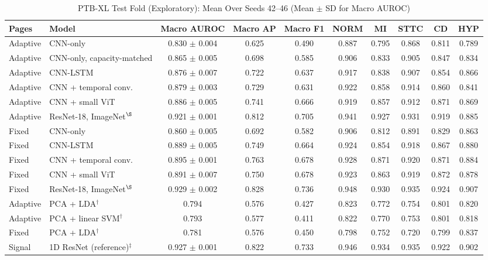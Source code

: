 \documentclass[journal]{IEEEtran}
\begin{document}
\begin{table}[!t]
\centering
\caption{PTB-XL Test Fold (Exploratory): Mean Over Seeds 42--46 (Mean $\pm$ SD for Macro AUROC)}
\label{tab:ptbxl}
\footnotesize
\begin{tabular}{llcccccccc}
\toprule
Pages & Model & Macro AUROC & Macro AP & Macro F1 & NORM & MI & STTC & CD & HYP \\
\midrule
Adaptive & CNN-only & 0.830 $\pm$ 0.004 & 0.625 & 0.490 & 0.887 & 0.795 & 0.868 & 0.811 & 0.789 \\
Adaptive & CNN-only, capacity-matched & 0.865 $\pm$ 0.005 & 0.698 & 0.585 & 0.906 & 0.833 & 0.905 & 0.847 & 0.834 \\
Adaptive & CNN-LSTM & 0.876 $\pm$ 0.007 & 0.722 & 0.637 & 0.917 & 0.838 & 0.907 & 0.854 & 0.866 \\
Adaptive & CNN + temporal conv. & 0.879 $\pm$ 0.003 & 0.729 & 0.631 & 0.922 & 0.858 & 0.914 & 0.860 & 0.841 \\
Adaptive & CNN + small ViT & 0.886 $\pm$ 0.005 & 0.741 & 0.666 & 0.919 & 0.857 & 0.912 & 0.871 & 0.869 \\
Adaptive & ResNet-18, ImageNet$^\S$ & 0.921 $\pm$ 0.001 & 0.812 & 0.705 & 0.941 & 0.927 & 0.931 & 0.919 & 0.885 \\
\midrule
Fixed & CNN-only & 0.860 $\pm$ 0.005 & 0.692 & 0.582 & 0.906 & 0.812 & 0.891 & 0.829 & 0.863 \\
Fixed & CNN-LSTM & 0.889 $\pm$ 0.005 & 0.749 & 0.664 & 0.924 & 0.854 & 0.918 & 0.867 & 0.880 \\
Fixed & CNN + temporal conv. & 0.895 $\pm$ 0.001 & 0.763 & 0.678 & 0.928 & 0.871 & 0.920 & 0.871 & 0.884 \\
Fixed & CNN + small ViT & 0.891 $\pm$ 0.007 & 0.750 & 0.678 & 0.923 & 0.863 & 0.919 & 0.872 & 0.878 \\
Fixed & ResNet-18, ImageNet$^\S$ & 0.929 $\pm$ 0.002 & 0.828 & 0.736 & 0.948 & 0.930 & 0.935 & 0.924 & 0.907 \\
\midrule
Adaptive & PCA + LDA$^\dagger$ & 0.794 & 0.576 & 0.427 & 0.823 & 0.772 & 0.754 & 0.801 & 0.820 \\
Adaptive & PCA + linear SVM$^\dagger$ & 0.793 & 0.577 & 0.411 & 0.822 & 0.770 & 0.753 & 0.801 & 0.818 \\
\midrule
Fixed & PCA + LDA$^\dagger$ & 0.781 & 0.576 & 0.450 & 0.798 & 0.752 & 0.720 & 0.799 & 0.837 \\
\midrule
Signal & 1D ResNet (reference)$^\ddagger$ & 0.927 $\pm$ 0.001 & 0.822 & 0.733 & 0.946 & 0.934 & 0.935 & 0.922 & 0.902 \\

\end{tabular}
\end{table}
\end{document}
